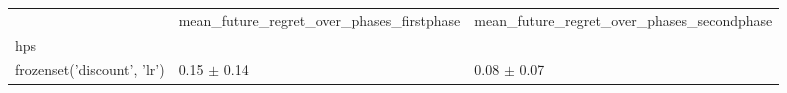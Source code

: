 \begin{tabular}{lll}
\toprule
 & mean_future_regret_over_phases_firstphase & mean_future_regret_over_phases_secondphase \\
hps &  &  \\
\midrule
frozenset({'discount', 'lr'}) & 0.15 $\pm$ 0.14 & 0.08 $\pm$ 0.07 \\
\bottomrule
\end{tabular}
